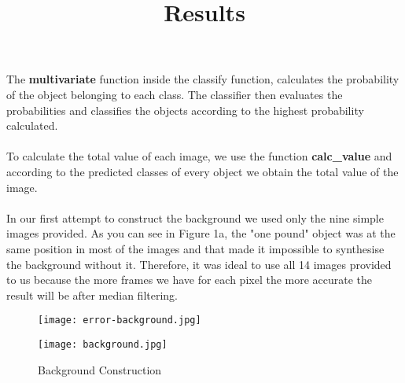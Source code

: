 \documentclass[11pt]{article}
\begin{document}
\paragraph{}
The \textbf{multivariate} function inside the classify function, calculates the probability of the object belonging to each class. The classifier then evaluates the probabilities and classifies the objects according to the highest probability calculated.
\paragraph{}
To calculate the total value of each image, we use the function \textbf{calc\_value} and according to the predicted classes of every object we obtain the total value of the image.

\newpage

\title{Results}\setlength{\droptitle}{-70pt}
\date{\vspace{-10ex}}
\maketitle

\paragraph{}
In our first attempt to construct the background we used only the nine simple images provided. As you can see in Figure 1a, the "one pound" object was at the same position in most of the images and that made it impossible to synthesise the background without it. Therefore, it was ideal to use all 14 images provided to us because the more frames we have for each pixel the more accurate the result will be after median filtering.   

\begin{figure}[H]
	\centering
	\begin{minipage}{0.5\textwidth}
		\centering
		\texttt{[image: error-background.jpg]}\\
	\end{minipage}%
	\begin{minipage}{0.5\textwidth}
		\centering
		\texttt{[image: background.jpg]}\\
	\end{minipage}%
	\centering
	\caption{Background Construction}
\end{figure}
\end{document}
